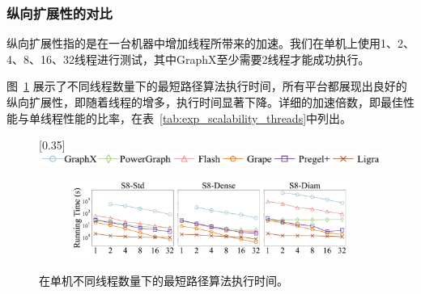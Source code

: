 \subsubsection{纵向扩展性的对比}

纵向扩展性指的是在一台机器中增加线程所带来的加速。我们在单机上使用1、2、4、8、16、32线程进行测试，其中GraphX至少需要2线程才能成功执行。

图~\ref{fig:exp_scalability_threads} 展示了不同线程数量下的最短路径算法执行时间，所有平台都展现出良好的纵向扩展性，即随着线程的增多，执行时间显著下降。详细的加速倍数，即最佳性能与单线程性能的比率，在表~\ref{tab:exp_scalability_threads}中列出。

\begin{table}[h]\centering
    \def\arraystretch{1.5}
    \caption{纵向扩展性加速倍数}
    \label{tab:exp_scalability_threads}
    \tiny
\end{table}

\begin{figure}[h]\centering

	\scalebox{0.35}[0.35]{\includegraphics{figures/vertical_scalability_legend.pdf}}

	\begin{subfigure}[b]{0.8\textwidth}
        \includegraphics[width=\textwidth]{figures/sssp_vertical_scalability.pdf}
    \end{subfigure}
	
	\caption{在单机不同线程数量下的最短路径算法执行时间。}
	\label{fig:exp_scalability_threads}
\end{figure}

